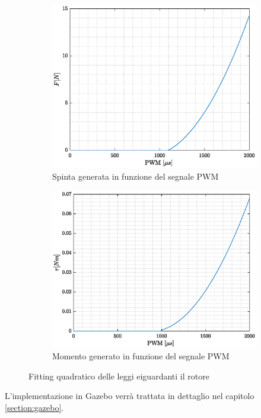\begin{figure}
	\centering
	\begin{subfigure}{0.45\textwidth}
		\centering
		\includegraphics[width=1\textwidth]{SistemaQuadrirotore/Figure/ForzaPWM}
		\caption{Spinta generata in funzione del segnale PWM}
	\end{subfigure}
	\hfill
	\begin{subfigure}{0.45\textwidth}
		\centering
		\includegraphics[width=1\textwidth]{SistemaQuadrirotore/Figure/MomentoPWM}
		\caption{Momento generato in funzione del segnale PWM}
	\end{subfigure}
	\caption{Fitting quadratico delle leggi eiguardanti il rotore}
	\label{fig:pwmTM}
\end{figure}
 
L'implementazione in Gazebo verrà trattata in dettaglio nel capitolo \ref{section:gazebo}.